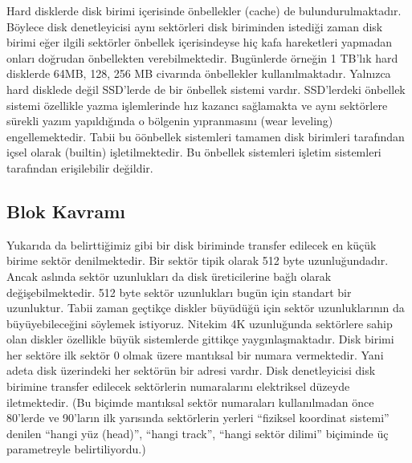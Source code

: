 \documentclass[a4paper,10pt,turkish]{sphinxmanual}
\begin{document}
\sphinxAtStartPar
Hard disklerde disk birimi içerisinde önbellekler (cache) de bulundurulmaktadır. Böylece disk denetleyicisi aynı
sektörleri disk biriminden istediği zaman disk birimi eğer ilgili sektörler önbellek içerisindeyse hiç kafa
hareketleri yapmadan onları doğrudan önbellekten verebilmektedir. Bugünlerde örneğin 1 TB’lık hard disklerde 64MB,
128, 256 MB civarında önbellekler kullanılmaktadır. Yalnızca hard disklede değil SSD’lerde de bir önbellek sistemi
vardır. SSD’lerdeki önbellek sistemi özellikle yazma işlemlerinde hız kazancı sağlamakta ve aynı sektörlere sürekli
yazım yapıldığında o bölgenin yıpranmasını (wear leveling) engellemektedir. Tabii bu öönbellek sistemleri tamamen
disk birimleri tarafından içsel olarak (built\sphinxhyphen{}in) işletilmektedir. Bu önbellek sistemleri işletim sistemleri tarafından
erişilebilir değildir.


\subsection{Blok Kavramı}
\label{\detokenize{filesystem1:blok-kavrami}}
\sphinxAtStartPar
Yukarıda da belirttiğimiz gibi bir disk biriminde transfer edilecek en küçük birime sektör denilmektedir. Bir sektör
tipik olarak 512 byte uzunluğundadır. Ancak aslında sektör uzunlukları da disk üreticilerine bağlı olarak değişebilmektedir.
512 byte sektör uzunlukları bugün için standart bir uzunluktur. Tabii zaman geçtikçe diskler büyüdüğü için sektör
uzunluklarının da büyüyebileceğini söylemek istiyoruz. Nitekim 4K uzunluğunda sektörlere sahip olan diskler özellikle
büyük sistemlerde gittikçe yaygınlaşmaktadır. Disk birimi her sektöre ilk sektör 0 olmak üzere mantıksal bir numara
vermektedir. Yani adeta disk üzerindeki her sektörün bir adresi vardır. Disk denetleyicisi disk birimine transfer
edilecek sektörlerin numaralarını elektriksel düzeyde iletmektedir. (Bu biçimde mantıksal sektör numaraları kullanılmadan
önce 80’lerde ve 90’ların ilk yarısında sektörlerin yerleri “fiziksel koordinat sistemi” denilen “hangi yüz (head)”,
“hangi track”, “hangi sektör dilimi” biçiminde üç parametreyle belirtiliyordu.)
\end{document}
